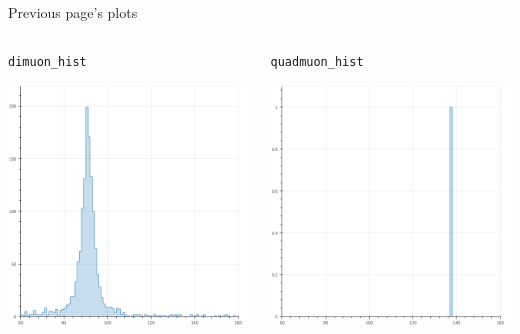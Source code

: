 \documentclass[aspectratio=169]{beamer}
\begin{document}
\begin{frame}{Previous page's plots}
\begin{columns}
\begin{center}
{\tt dimuon\_hist}

\includegraphics[width=\linewidth]{dimuon_hist.png}
\end{center}
\begin{center}
{\tt quadmuon\_hist}

\includegraphics[width=\linewidth]{quadmuon_hist.png}
\end{center}
\end{columns}
\end{frame}
\end{document}
